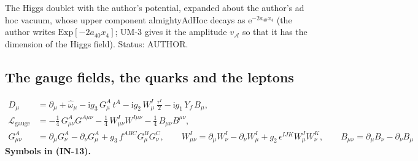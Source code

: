 \documentclass[
  10pt,
]{article}
\begin{document}
The Higgs doublet with the author's potential, expanded about the
author's ad hoc vacuum, whose upper component almightyAdHoc decays as
\(\mathrm{e}^{-2a_{40}x_4}\) (the author writes
\(\mathrm{Exp}[-2a_{40}x_4]\); UM-3 gives it the amplitude
\(v_{\mathcal{A}}\) so that it has the dimension of the Higgs field).
Status: AUTHOR.

\hypertarget{the-gauge-fields-the-quarks-and-the-leptons}{%
\subsection{The gauge fields, the quarks and the
leptons}\label{the-gauge-fields-the-quarks-and-the-leptons}}

\[
\begin{aligned}
D_\mu &= \partial_\mu + \hat\omega_\mu - \mathrm{i}g_3\,G^A_\mu\,t^A - \mathrm{i}g_2\,W^I_\mu\,\frac{\tau^I}{2}
 - \mathrm{i}g_1\,Y_f\,B_\mu,\\
\mathcal{L}_{\mathrm{gauge}} &= -\frac14\,G^A_{\mu\nu}G^{A\mu\nu} - \frac14\,W^I_{\mu\nu}W^{I\mu\nu} - \frac14\,B_{\mu\nu}B^{\mu\nu},\\
G^A_{\mu\nu} &= \partial_\mu G^A_\nu - \partial_\nu G^A_\mu + g_3\,f^{ABC}G^B_\mu G^C_\nu,\qquad
W^I_{\mu\nu} = \partial_\mu W^I_\nu - \partial_\nu W^I_\mu + g_2\,\epsilon^{IJK}W^J_\mu W^K_\nu,\qquad
B_{\mu\nu} = \partial_\mu B_\nu - \partial_\nu B_\mu
\end{aligned} \tag{IN-13}
\] \textbf{Symbols in (IN-13).}
\end{document}
